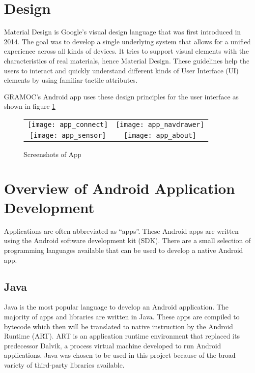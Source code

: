 \section{Design}
Material Design is Google's visual design language that was first introduced in 2014. The goal was to develop a single underlying system that allows for a unified experience across all kinds of devices. It tries to support visual elements with the characteristics of real materials, hence Material Design. These guidelines help the users to interact and quickly understand different kinds of User Interface (UI) elements by using familiar tactile attributes.

GRAMOC's Android app uses these design principles for the user interface as shown in figure \ref{fig:appscreenshots}

\begin{figure}[H]
	\centering
	\begin{tabular}{cc}
	\texttt{[image: app\_connect]}
	&
	\texttt{[image: app\_navdrawer]}
	\\
	\texttt{[image: app\_sensor]}
	&
	\texttt{[image: app\_about]}
	\end{tabular}
	\caption{Screenshots of App}
	\label{fig:appscreenshots}
\end{figure}

\section{Overview of Android Application Development}
 Applications are often abbreviated as ``apps''. These Android apps are written using the Android software development kit (SDK). There are a small selection of programming languages available that can be used to develop a native Android app.

\subsection{Java}
Java is the most popular language to develop an Android application. The majority of apps and libraries are written in Java. These apps are compiled to bytecode which then will be translated to native instruction by the Android Runtime (ART). ART is an application runtime environment that replaced its predecessor Dalvik, a process virtual machine developed to run Android applications. Java was chosen to be used in this project because of the broad variety of third-party libraries available.

